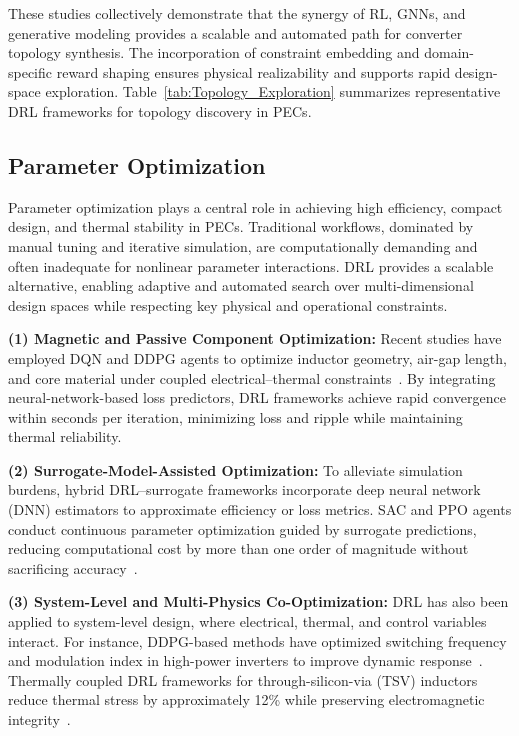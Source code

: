 These studies collectively demonstrate that the synergy of RL, GNNs, and generative modeling provides a scalable and automated path for converter topology synthesis. 
The incorporation of constraint embedding and domain-specific reward shaping ensures physical realizability and supports rapid design-space exploration. 
Table~\ref{tab:Topology_Exploration} summarizes representative DRL frameworks for topology discovery in PECs.


\subsection{Parameter Optimization}
\label{sec:param_opt}

Parameter optimization plays a central role in achieving high efficiency, compact design, and thermal stability in PECs. 
Traditional workflows, dominated by manual tuning and iterative simulation, are computationally demanding and often inadequate for nonlinear parameter interactions.  
DRL provides a scalable alternative, enabling adaptive and automated search over multi-dimensional design spaces while respecting key physical and operational constraints.

\textbf{(1) Magnetic and Passive Component Optimization:}  
Recent studies have employed DQN and DDPG agents to optimize inductor geometry, air-gap length, and core material under coupled electrical–thermal constraints~\cite{tian2022deep,tian2022parameter,tian2024optimizing}.  
By integrating neural-network-based loss predictors, DRL frameworks achieve rapid convergence within seconds per iteration, minimizing loss and ripple while maintaining thermal reliability.

\textbf{(2) Surrogate-Model-Assisted Optimization:}  
To alleviate simulation burdens, hybrid DRL–surrogate frameworks incorporate deep neural network (DNN) estimators to approximate efficiency or loss metrics.  
SAC and PPO agents conduct continuous parameter optimization guided by surrogate predictions, reducing computational cost by more than one order of magnitude without sacrificing accuracy~\cite{bui2022deep,bui2023deep}.  

\textbf{(3) System-Level and Multi-Physics Co-Optimization:}  
DRL has also been applied to system-level design, where electrical, thermal, and control variables interact.  
For instance, DDPG-based methods have optimized switching frequency and modulation index in high-power inverters to improve dynamic response~\cite{wang2022efficiency}.  
Thermally coupled DRL frameworks for through-silicon-via (TSV) inductors reduce thermal stress by approximately 12\% while preserving electromagnetic integrity~\cite{wang2023modeling}.  

